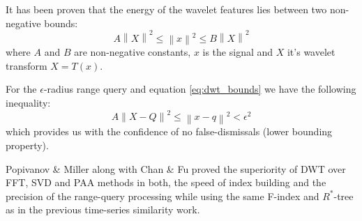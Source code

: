 It has been proven \cite{citeulike:499150} that the energy of the wavelet features lies between two non-negative bounds:
\begin{equation}
A \left\| X \right\|^{2} \leq \left\| x \right\|^{2} \leq B \left\| X \right\|^{2}
\label{eq:dwt_bounds}
\end{equation}
where $A$ and $B$ are non-negative constants, $x$ is the signal and $X$ it's wavelet transform $X=T(x)$. 

For the $\epsilon$-radius range query and equation \ref{eq:dwt_bounds} we have the following inequality:
\begin{equation}
A \left\| X-Q \right\|^{2} \leq \left\| x-q \right\|^{2} < \epsilon^{2} 
\label{eq:range}
\end{equation}
which provides us with the confidence of no false-dismissals (lower bounding property).

Popivanov \& Miller along with Chan \& Fu \cite{citeulike:4384535} proved the superiority of DWT over FFT, SVD and PAA methods in both, the speed of index building and the precision of the range-query processing while using the same F-index and $R^{*}$-tree as in the previous time-series similarity work.  